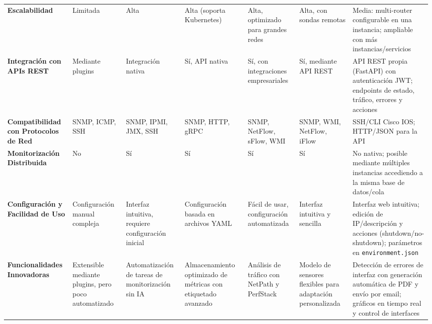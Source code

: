 \begin{landscape}
\begin{xltabular}{\linewidth}{>{\bfseries}p{4.2cm} *{6}{Y}}
Escalabilidad
& Limitada
& Alta
& Alta (soporta Kubernetes)
& Alta, optimizado para grandes redes
& Alta, con sondas remotas
& Media: multi-router configurable en una instancia; ampliable con más instancias/servicios
\\

Integración con APIs REST
& Mediante plugins
& Integración nativa
& Sí, API nativa
& Sí, con integraciones empresariales
& Sí, mediante API REST
& API REST propia (FastAPI) con autenticación JWT; endpoints de estado, tráfico, errores y acciones
\\

Compatibilidad con Protocolos de Red
& SNMP, ICMP, SSH
& SNMP, IPMI, JMX, SSH
& SNMP, HTTP, gRPC
& SNMP, NetFlow, sFlow, WMI
& SNMP, WMI, NetFlow, iFlow
& SSH/CLI Cisco IOS; HTTP/JSON para la API
\\

Monitorización Distribuida
& No
& Sí
& Sí
& Sí
& Sí
& No nativa; posible mediante múltiples instancias accediendo a la misma base de datos/cola
\\

Configuración y Facilidad de Uso
& Configuración manual compleja
& Interfaz intuitiva, requiere configuración inicial
& Configuración basada en archivos YAML
& Fácil de usar, configuración automatizada
& Interfaz intuitiva y sencilla
& Interfaz web intuitiva; edición de IP/descripción y acciones (shutdown/no-shutdown); parámetros en \texttt{environment.json}
\\

Funcionalidades Innovadoras
& Extensible mediante plugins, pero poco automatizado
& Automatización de tareas de monitorización sin IA
& Almacenamiento optimizado de métricas con etiquetado avanzado
& Análisis de tráfico con NetPath y PerfStack
& Modelo de sensores flexibles para adaptación personalizada
& Detección de errores de interfaz con generación automática de PDF y envío por email; gráficos en tiempo real y control de interfaces
\\

\end{xltabular}
\end{landscape}



